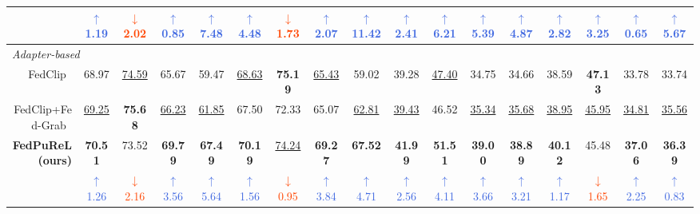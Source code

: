 \documentclass[10pt,twocolumn,letterpaper]{article}
\newcommand{\blueup}[1]{\textcolor{RoyalBlue}{$\uparrow$ #1}}
\newcommand{\reddown}[1]{\textcolor{OrangeRed}{$\downarrow$ #1}}
\begin{document}
\begin{table}[t]
\begin{tabular}{r||cccc|cccc|cccc|cccc}
\textcolor{gray!60}&
\blueup{1.19} & \reddown{2.02} & \blueup{0.85} & \blueup{7.48} &
\blueup{4.48} & \reddown{1.73} & \blueup{2.07} & \blueup{11.42} &
\blueup{2.41} & \blueup{6.21} & \blueup{5.39} & \blueup{4.87} &
\blueup{2.82} & \blueup{3.25} & \blueup{0.65} & \blueup{5.67} \\

\hline
\multicolumn{17}{l}{\textcolor{gray!60}{\textit{Adapter-based}}} \\
\cellcolor{gray!10}
FedClip~\cite{lu2023fedclip}
 & \cellcolor{gray!10}68.97 & \cellcolor{gray!10}\underline{74.59} & \cellcolor{gray!10}65.67 & \cellcolor{gray!10}59.47
 & \cellcolor{gray!10}\underline{68.63} & \cellcolor{gray!10}\textbf{75.19} & \cellcolor{gray!10}\underline{65.43} & \cellcolor{gray!10}59.02
 & \cellcolor{gray!10}39.28 & \cellcolor{gray!10}\underline{47.40} & \cellcolor{gray!10}34.75 & \cellcolor{gray!10}34.66
 & \cellcolor{gray!10}38.59 & \cellcolor{gray!10}\textbf{47.13} & \cellcolor{gray!10}33.78 & \cellcolor{gray!10}33.74 \\

 
FedClip+Fed-Grab~\cite{Fed-Grab}
 & \underline{69.25} & \textbf{75.68} & \underline{66.23} & \underline{61.85}
 & 67.50 & 72.33 & 65.07 & \underline{62.81}
 & \underline{39.43} & 46.52 & \underline{35.34} & \underline{35.68}
 & \underline{38.95} & \underline{45.95} & \underline{34.81} & \underline{35.56} \\


\cellcolor[HTML]{D7F6FF}\textbf{FedPuReL (ours)}
 & \cellcolor[HTML]{D7F6FF}\textbf{70.51} & \cellcolor[HTML]{D7F6FF}73.52 & \cellcolor[HTML]{D7F6FF}\textbf{69.79} & \cellcolor[HTML]{D7F6FF}\textbf{67.49}
 & \cellcolor[HTML]{D7F6FF}\textbf{70.19} & \cellcolor[HTML]{D7F6FF}\underline{74.24} & \cellcolor[HTML]{D7F6FF}\textbf{69.27} & \cellcolor[HTML]{D7F6FF}\textbf{67.52}
 & \cellcolor[HTML]{D7F6FF}\textbf{41.99} & \cellcolor[HTML]{D7F6FF}\textbf{51.51} & \cellcolor[HTML]{D7F6FF}\textbf{39.00} & \cellcolor[HTML]{D7F6FF}\textbf{38.89}
 & \cellcolor[HTML]{D7F6FF}\textbf{40.12} & \cellcolor[HTML]{D7F6FF}45.48 & \cellcolor[HTML]{D7F6FF}\textbf{37.06} & \cellcolor[HTML]{D7F6FF}\textbf{36.39} \\

\textcolor{gray!60} &
\blueup{1.26} & \reddown{2.16} & \blueup{3.56} & \blueup{5.64} &
\blueup{1.56} & \reddown{0.95} & \blueup{3.84} & \blueup{4.71} &
\blueup{2.56} & \blueup{4.11} & \blueup{3.66} & \blueup{3.21} &
\blueup{1.17} & \reddown{1.65} & \blueup{2.25} & \blueup{0.83} \\

\end{tabular}
 \vspace{-1em}
\label{tab:imagenet_places_lt}
\end{table}
\end{document}
